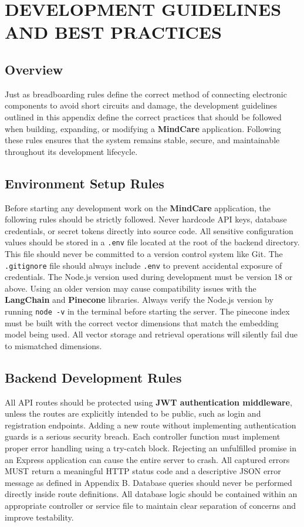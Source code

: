 \documentclass[a4paper,12pt]{report}
\begin{document}
\chapter{DEVELOPMENT GUIDELINES AND BEST PRACTICES}
\section{Overview}
Just as breadboarding rules define the correct method of connecting electronic components to avoid short circuits and damage, the development guidelines outlined in this appendix define the correct practices that should be followed when building, expanding, or modifying a \textbf{MindCare} application. Following these rules ensures that the system remains stable, secure, and maintainable throughout its development lifecycle.

\section{Environment Setup Rules}
Before starting any development work on the \textbf{MindCare} application, the following rules should be strictly followed.
Never hardcode API keys, database credentials, or secret tokens directly into source code. All sensitive configuration values should be stored in a \texttt{.env} file located at the root of the backend directory. This file should never be committed to a version control system like Git. The \texttt{.gitignore} file should always include \texttt{.env} to prevent accidental exposure of credentials.
The Node.js version used during development must be version 18 or above. Using an older version may cause compatibility issues with the \textbf{LangChain} and \textbf{Pinecone} libraries. Always verify the Node.js version by running \texttt{node -v} in the terminal before starting the server.
The pinecone index must be built with the correct vector dimensions that match the embedding model being used. All vector storage and retrieval operations will silently fail due to mismatched dimensions.

\section{Backend Development Rules}
All API routes should be protected using \textbf{JWT authentication middleware}, unless the routes are explicitly intended to be public, such as login and registration endpoints. Adding a new route without implementing authentication guards is a serious security breach.
Each controller function must implement proper error handling using a try-catch block. Rejecting an unfulfilled promise in an Express application can cause the entire server to crash. All captured errors MUST return a meaningful HTTP status code and a descriptive JSON error message as defined in Appendix B.
Database queries should never be performed directly inside route definitions. All database logic should be contained within an appropriate controller or service file to maintain clear separation of concerns and improve testability.
\end{document}
